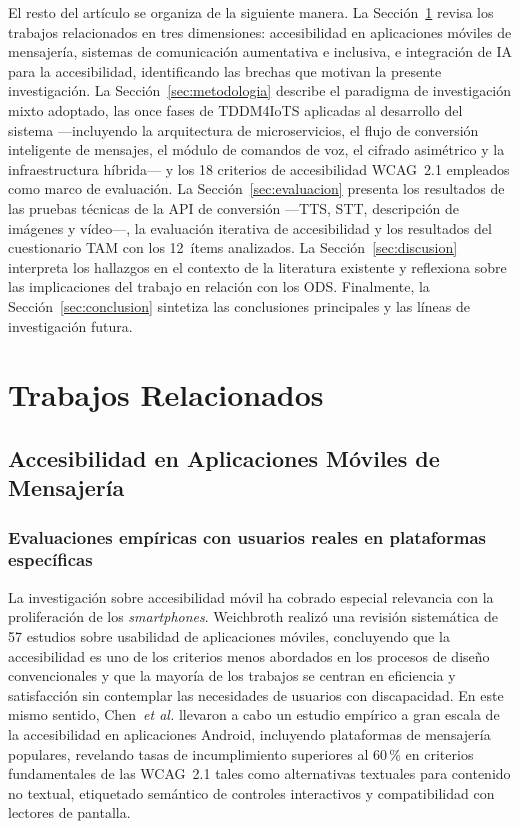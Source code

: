 \documentclass[journal]{IEEEtran}
\begin{document}
	El resto del art\'iculo se organiza de la siguiente manera. La Secci\'on~\ref{sec:relacionados} revisa los trabajos relacionados en tres dimensiones: accesibilidad en aplicaciones m\'oviles de mensajer\'ia, sistemas de comunicaci\'on aumentativa e inclusiva, e integraci\'on de IA para la accesibilidad, identificando las brechas que motivan la presente investigaci\'on. La Secci\'on~\ref{sec:metodologia} describe el paradigma de investigaci\'on mixto adoptado, las once fases de TDDM4IoTS aplicadas al desarrollo del sistema ---incluyendo la arquitectura de microservicios, el flujo de conversi\'on inteligente de mensajes, el m\'odulo de comandos de voz, el cifrado asim\'etrico y la infraestructura h\'ibrida--- y los 18 criterios de accesibilidad WCAG~2.1 empleados como marco de evaluaci\'on. La Secci\'on~\ref{sec:evaluacion} presenta los resultados de las pruebas t\'ecnicas de la API de conversi\'on ---TTS, STT, descripci\'on de im\'agenes y v\'ideo---, la evaluaci\'on iterativa de accesibilidad y los resultados del cuestionario TAM con los 12~\'items analizados. La Secci\'on~\ref{sec:discusion} interpreta los hallazgos en el contexto de la literatura existente y reflexiona sobre las implicaciones del trabajo en relaci\'on con los ODS. Finalmente, la Secci\'on~\ref{sec:conclusion} sintetiza las conclusiones principales y las l\'ineas de investigaci\'on futura.
	
	\section{Trabajos Relacionados}
	\label{sec:relacionados}
	
	\subsection{Accesibilidad en Aplicaciones M\'oviles de Mensajer\'ia}
	
	\subsubsection{Evaluaciones emp\'iricas con usuarios reales en plataformas espec\'ificas}
	La investigaci\'on sobre accesibilidad m\'ovil ha cobrado especial relevancia con la proliferaci\'on de los \textit{smartphones}. Weichbroth \cite{weichbroth2020} realiz\'o una revisi\'on sistem\'atica de 57 estudios sobre usabilidad de aplicaciones m\'oviles, concluyendo que la accesibilidad es uno de los criterios menos abordados en los procesos de dise\~no convencionales y que la mayor\'ia de los trabajos se centran en eficiencia y satisfacci\'on sin contemplar las necesidades de usuarios con discapacidad. En este mismo sentido, Chen~\textit{et al.} \cite{chen2022} llevaron a cabo un estudio emp\'irico a gran escala de la accesibilidad en aplicaciones Android, incluyendo plataformas de mensajer\'ia populares, revelando tasas de incumplimiento superiores al 60\,\% en criterios fundamentales de las WCAG~2.1 tales como alternativas textuales para contenido no textual, etiquetado sem\'antico de controles interactivos y compatibilidad con lectores de pantalla.
	
\end{document}

